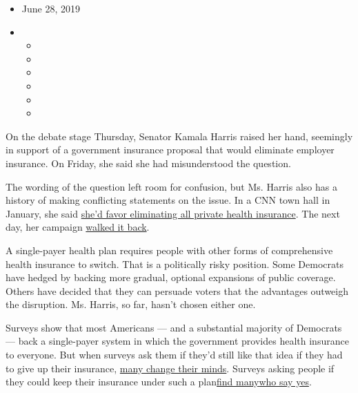 \begin{itemize}
\item
  June 28, 2019
\item
  \begin{itemize}
  \item
  \item
  \item
  \item
  \item
  \item
  \end{itemize}
\end{itemize}

On the debate stage Thursday, Senator Kamala Harris raised her hand,
seemingly in support of a government insurance proposal that would
eliminate employer insurance. On Friday, she said she had misunderstood
the question.

The wording of the question left room for confusion, but Ms. Harris also
has a history of making conflicting statements on the issue. In a CNN
town hall in January, she said
\href{https://www.cnn.com/2019/01/29/politics/harris-private-insurance-medicare/index.html}{she'd
favor eliminating all private health insurance}. The next day, her
campaign
\href{https://www.nytimes3xbfgragh.onion/2019/01/29/us/politics/medicare-for-all-harris-bloomberg.html}{walked
it back}.

A single-payer health plan requires people with other forms of
comprehensive health insurance to switch. That is a politically risky
position. Some Democrats have hedged by backing more gradual, optional
expansions of public coverage. Others have decided that they can
persuade voters that the advantages outweigh the disruption. Ms. Harris,
so far, hasn't chosen either one.

Surveys show that most Americans --- and a substantial majority of
Democrats --- back a single-payer system in which the government
provides health insurance to everyone. But when surveys ask them if
they'd still like that idea if they had to give up their insurance,
\href{https://www.kff.org/slideshow/public-opinion-on-single-payer-national-health-plans-and-expanding-access-to-medicare-coverage/}{many
change their minds}. Surveys asking people if they could keep their
insurance under such a
plan\href{https://www.kff.org/health-reform/press-release/poll-most-americans-dont-realize-how-dramatically-medicare-for-all-proposals-would-revamp-nations-health-care-system/}{find
many}\href{http://www.norc.org/NewsEventsPublications/PressReleases/Pages/knowledge-about-medicare-for-all-remains-low.aspx}{who
say yes}.

